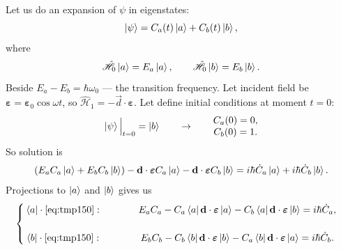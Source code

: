 Let us do an expansion of $\psi$ in eigenstates:
\begin{equation}
	\left\lvert {\psi} \right\rangle = C_a(t) \left\lvert {a} \right\rangle + C_b(t) \left\lvert {b} \right\rangle,
\end{equation}
where
\begin{equation}
	\hat{\mathscr{H}}_0 \left\lvert {a} \right\rangle = E_a \left\lvert {a} \right\rangle, \qquad \hat{\mathscr{H}}_0 \left\lvert {b} \right\rangle = E_b \left\lvert {b} \right\rangle.
\end{equation}
Beside $E_a - E_b = \hbar \omega_0$ --- the transition frequency. Let incident field be $\bm{\varepsilon} = \bm{\varepsilon}_0 \cos \omega t$, so $\hat{\mathscr{H}}_1 = - \vec{d} \cdot \bm{\varepsilon}$. Let define initial conditions at moment $t = 0$:
\begin{equation}
	\left\lvert {\psi} \right\rangle \Big|_{t = 0} = \left\lvert {b} \right\rangle \qquad \to \qquad
	\begin{matrix}
		C_a(0) = 0, \\
		C_b(0) = 1.
	\end{matrix}
\end{equation}
So solution is
\begin{equation}
	\left( E_a C_a \left\lvert {a} \right\rangle + E_b C_b \left\lvert {b} \right\rangle \right) - \mathbf{d} \cdot \bm{\varepsilon} C_a \left\lvert {a} \right\rangle - \mathbf{d} \cdot \bm{\varepsilon} C_b \left\lvert {b} \right\rangle = i \hbar \dot{C}_a \left\lvert {a} \right\rangle + i \hbar \dot{C}_b \left\lvert {b} \right\rangle.
	\label{eq:tmp150}
\end{equation}
Projections to $\left\lvert {a} \right\rangle$ and $\left\lvert {b} \right\rangle$ gives us
\begin{equation}
\begin{cases}
	\begin{matrix}
	\left\langle {a} \right\rvert \cdot \eqref{eq:tmp150}: &\qquad&
	E_a C_a - C_a \left\langle {a} \right\rvert \mathbf{d} \cdot \bm{\varepsilon} \left\lvert {a} \right\rangle - C_b \left\langle {a} \right\rvert \mathbf{d} \cdot \bm{\varepsilon} \left\lvert {b} \right\rangle = i \hbar \dot{C}_a, \\  \\
	\left\langle {b} \right\rvert \cdot \eqref{eq:tmp150}: &\qquad&
	E_b C_b - C_b \left\langle {b} \right\rvert \mathbf{d} \cdot \bm{\varepsilon} \left\lvert {b} \right\rangle - C_a \left\langle {b} \right\rvert \mathbf{d} \cdot \bm{\varepsilon} \left\lvert {a} \right\rangle = i \hbar \dot{C}_b.
	\end{matrix}
\end{cases}
\label{eq:tmp151}
\end{equation}

